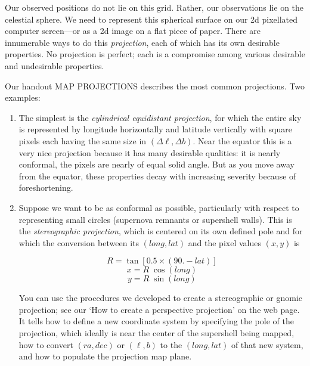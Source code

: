 \documentclass[psfig,preprint]{aastex}
\begin{document}
Our observed positions do not lie on this grid. Rather, our observations
lie on the celestial sphere. We need to represent this spherical surface
on our 2d pixellated computer screen---or as a 2d image on
a flat piece of paper. There are innumerable ways to do this
{\it projection}, each of which has its own
desirable properties. No projection is perfect; each is a compromise 
among various desirable and undesirable properties. 

Our handout MAP PROJECTIONS describes the most common projections. Two
examples:
\begin{enumerate}

\item The simplest is the {\it cylindrical
equidistant projection}, for which the entire sky is represented by
longitude horizontally and latitude vertically with square pixels each
having the same size in $(\Delta \ell, \Delta b)$. Near the equator this
is a very nice projection because it has many desirable qualities: it
is nearly conformal, the pixels are nearly of equal solid angle. But as
you move away from the equator, these properties decay with increasing
severity because of foreshortening.

\item Suppose we want to be as conformal as possible, particularly with
  respect to representing small circles (supernova remnants or
  supershell walls). This is the {\it stereographic projection}, which
  is centered on its own defined pole and for which the conversion
  between its $(long, lat)$ and the pixel values $(x,y)$ is
%
\begin {mathletters}
\begin{equation}
   R = \tan[ 0.5 \times (90.-lat)] 
\end{equation}
\begin{equation}
   x= R \; \cos(long) 
\end{equation}
\begin{equation}
   y= R \; \sin(long) 
\end{equation}
\end {mathletters}
%
You can use the procedures we developed to create a stereographic or
gnomic projection; see our `How to create a perspective projection'
on the web page. It tells how to define a 
new coordinate system by specifying the pole of the projection, which ideally
is near the center of the supershell being mapped, how to convert
$(ra,dec)$ or $(\ell,b)$ to the $(long,lat)$ of that new system, and how
to populate the projection map plane.

\end{enumerate}
\end{document}
